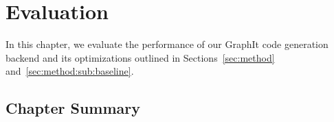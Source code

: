 \chapter{Evaluation}\label{sec:eval}

In this chapter, we evaluate the performance of our GraphIt code generation backend and its optimizations outlined in Sections~\ref{sec:method} and~\ref{sec:method:sub:baseline}.




\section{Chapter Summary}